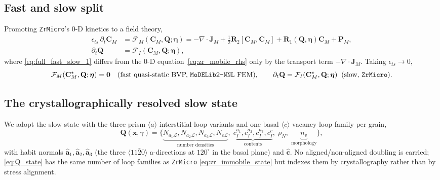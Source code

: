 \documentclass[11pt]{article}
\newcommand{\CM}{\mathbf{C}_{M}}
\newcommand{\Rone}{\mathbf{R}_{1}}
\newcommand{\Rtwo}{\mathbf{R}_{2}}
\newcommand{\PM}{\mathbf{P}_{M}}
\newcommand{\Div}{\nabla\cdot}
\newcommand{\Lcal}{\mathcal{L}}
\newcommand{\ZrMicro}{\texttt{ZrMicro}}
\newcommand{\MoDELib}{\texttt{MoDELib2-NNL}}
\begin{document}
\subsection{Fast and slow split}

Promoting \ZrMicro{}'s 0-D kinetics to a field theory,
\begin{align}
\label{eq:full_fast_slow_1}
    \epsilon_{ts}\,\partial_t \CM
    &=
    \mathcal{F}_{M}(\CM,\mathbf{Q};\bm{\eta})
    = -\Div\mathbf J_M + \tfrac12 \Rtwo[\CM,\CM] + \Rone(\mathbf Q,\bm\eta)\CM + \PM,
    \\
\label{eq:full_fast_slow_2}
    \partial_t \mathbf{Q}
    &=
    \mathcal{F}_{I}(\CM,\mathbf{Q};\bm{\eta}),
\end{align}
where \eqref{eq:full_fast_slow_1} differs from the 0-D
equation~\eqref{eq:zr_mobile_rhs} only by the transport term $-\Div\mathbf J_M$.
Taking $\epsilon_{ts}\to0$,
\begin{equation}
\label{eq:fast_constraint}
    \mathcal{F}_{M}(\CM^\star,\mathbf{Q};\bm{\eta}) = \mathbf{0}
    \quad\text{(fast quasi-static BVP, \MoDELib{} FEM)},
    \qquad
    \partial_t \mathbf{Q}
    =
    \mathcal{F}_{I}(\CM^{\star},\mathbf{Q};\bm{\eta})
    \;\;\text{(slow, \ZrMicro{})}.
\end{equation}

\subsection{The crystallographically resolved slow state}
\label{sec:slowstate}

We adopt the slow state with the three prism $\langle a\rangle$ interstitial-loop
variants and one basal $\langle c\rangle$ vacancy-loop family per grain,
\begin{equation}
\label{eq:Q_state}
    \mathbf{Q}(\mathbf x,\gamma)
    =
    \big\{
    \underbrace{N_{a_1\Lcal},N_{a_2\Lcal},N_{a_3\Lcal},N_{c\Lcal}}_{\text{number densities}},\;
    \underbrace{c^{a_1}_I,c^{a_2}_I,c^{a_3}_I,c^{c}_I}_{\text{contents}},\;
    \rho_N,\;
    \underbrace{n_v}_{\text{morphology}}
    \big\},
\end{equation}
with habit normals $\hat{\mathbf a}_1,\hat{\mathbf a}_2,\hat{\mathbf a}_3$ (the
three $\langle 11\bar20\rangle$ a-directions at $120^\circ$ in the basal plane)
and $\hat{\mathbf c}$. No aligned/non-aligned doubling is carried;
\eqref{eq:Q_state} has the same number of loop families as \ZrMicro{}
\eqref{eq:zr_immobile_state} but indexes them by crystallography rather than by
stress alignment.
\end{document}
